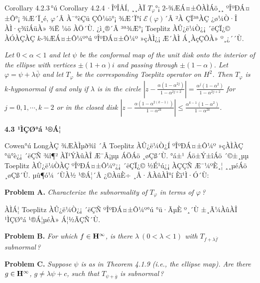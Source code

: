 \documentclass[12pt,a4paper,2sided]{article}
\begin{document}
Corollary 4.2.3\,°ú Corollary 4.2.4\,·ÎºÎÅÍ, ¸¸ÀÏ $T_\varphi$°¡
$2$-¾ÆÁ¤±ÔÀÌÁö¸¸ ºÎºÐÁ¤±Ô°¡ ¾Æ´Ï¸é, $\varphi$´Â À¯°èÇü ÇÔ¼ö°¡ ¾Æ´Ï°í
$\mathcal{E}(\varphi)$´Â ²À ÇÏ³ªÀÇ ¿ø¼Ò·Î ÀÌ·ç¾îÁüÀ» ¾Ë ¼ö ÀÖ´Ù.
¿ì¸®´Â ³ª¾Æ°¡ Toeplitz ÀÛ¿ë¼Ò¿¡ ´ëÇÏ¿© ÀÓÀÇÀÇ $k$-¾ÆÁ¤±Ô¼º°ú
ºÎºÐÁ¤±Ô¼º »çÀÌ¿¡ Æ´ÀÌ Á¸ÀçÇÔÀ» º¸¿´´Ù.

\vspace{.2 cm}{\bf Theorem 4.2.5.} {\rm \cite{CLL}} {\sl Let
$0<\alpha<1$ and let $\psi$ be the conformal map of the unit disk
onto the interior of the ellipse with vertices $\pm(1+\alpha)i$ and
passing through $\pm(1-\alpha)$. Let $\varphi=\psi+\lambda\bar\psi$
and let $T_\varphi$ be the corresponding Toeplitz operator on $H^2$.
Then $T_\varphi$ is $k$-hyponormal if and only if $\lambda$ is in
the circle $\left|z-\frac{\alpha(1-\alpha^{2j})}
{1-\alpha^{2j+2}}\right|
=\frac{\alpha^j(1-\alpha^2)}{1-\alpha^{2j+2}}$ for $j=0,1,\cdots
,k-2 $ or in the closed disk
$\left|z-\frac{\alpha(1-\alpha^{2(k-1)})} {1-\alpha^{2k}}\right| \le
\frac{\alpha^{k-1}(1-\alpha^2)}{1-\alpha^{2k}}$. }

\vspace{.3 cm} {\bf 4.3 ¹ÌÇØ°á ¹®Á¦}

\vspace{.3 cm} Cowen°ú LongÀÇ ¾ÆÀÌµð¾î \cite{CoL}´Â Toeplitz
ÀÛ¿ë¼Ò¿Í ºÎºÐÁ¤±Ô¼º »çÀÌÀÇ °ü°è¿¡ ´ëÇÑ ¾î¶² ÀÏ¹ÝÀûÀÎ Æ¯Â¡µµ ÁÖÁö
¸øÇß´Ù. °á±¹ Áö±Ý±îÁö ´©±¸µµ Toeplitz ÀÛ¿ë¼ÒÀÇ ºÎºÐÁ¤±Ô¼º¿¡ ´ëÇÏ¿©
½É¹ú¿¡ ÀÇÇÑ Æ¯¼ºÈ­¸¦ ¸¸µéÁö ¸øÇß´Ù. µû¶ó¼­ ´ÙÀ½ ¹®Á¦´Â ¿©ÀüÈ÷
¸Å·ÂÀûÀÌ°í Èï¹Ì·Ó´Ù:

\vspace{.2 cm}

{\bf Problem A.}  {\sl Characterize the subnormality of
$T_\varphi$ in terms of $\varphi$\,? }

\vspace{.2 cm} ÀÌÁ¦ Toeplitz ÀÛ¿ë¼Ò¿¡ ´ëÇÑ ºÎºÐÁ¤±Ô¼º°ú °ü·ÃµÈ º¸´Ù
±¸Ã¼ÀûÀÎ ¹ÌÇØ°á ¹®Á¦µéÀ» Á¦½ÃÇÑ´Ù.



\newpage {} \vspace{.8 cm}

{\bf Problem B.}  {\sl For which $f\in{\bold H}^{\infty}$, is there
$\lambda\ (0<\lambda<1)$ with $T_{f +\lambda\overline{f}}$
subnormal\,? }

\vspace{.2 cm} {\bf Problem C.} {\sl Suppose $\psi$ is as in Theorem
4.1.9 (i.e., the ellipse map). Are there $g\in{\bold H}^{\infty}$,
$g\neq\lambda\psi +c$, such that $T_{\psi+\overline{g}}$ is
subnormal\,? }
\end{document}
